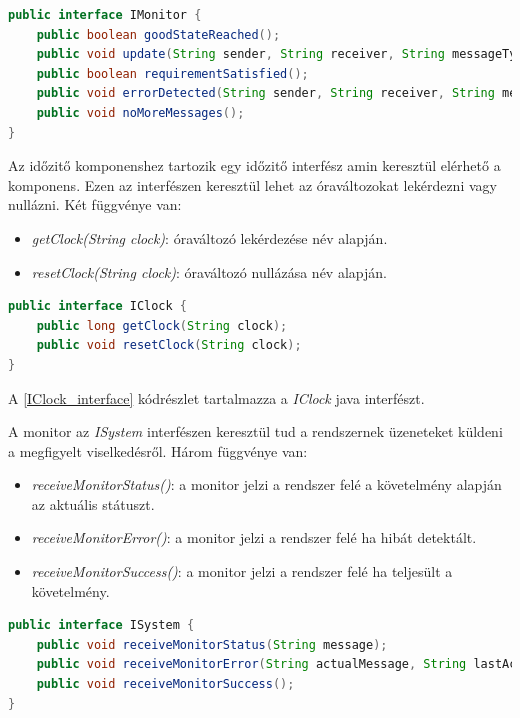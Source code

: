 \begin{lstlisting}[language=java,frame=single, float=h!, caption={Monitor interfész Java implementációja.},captionpos=b,label=IMonitor_interface]
public interface IMonitor {
	public boolean goodStateReached();
	public void update(String sender, String receiver, String messageType, Map<String, Object> parameters);
	public boolean requirementSatisfied();
	public void errorDetected(String sender, String receiver, String messageType, Map<String, Object> parameters);
	public void noMoreMessages();
}
\end{lstlisting}

Az időzitő komponenshez tartozik egy időzitő interfész amin keresztül elérhető a komponens.
Ezen az interfészen keresztül lehet az óraváltozokat lekérdezni vagy nullázni.
Két függvénye van:

\begin{itemize}
    \item \textit{getClock(String clock)}: óraváltozó lekérdezése név alapján.
    \item \textit{resetClock(String clock)}: óraváltozó nullázása név alapján.
\end{itemize}

\begin{lstlisting}[language=java,frame=single, float=h!, caption={Időzitő interfész Java implementációja.},captionpos=b,label=IClock_interface]
public interface IClock {
	public long getClock(String clock);
	public void resetClock(String clock);
}
\end{lstlisting}

A \ref{IClock_interface} kódrészlet tartalmazza a \textit{IClock} java interfészt.

A monitor az \textit{ISystem} interfészen keresztül tud a rendszernek üzeneteket küldeni a megfigyelt viselkedésről.
Három függvénye van:

\begin{itemize}
	\item \textit{receiveMonitorStatus()}: a monitor jelzi a rendszer felé a követelmény alapján az aktuális státuszt.
	\item \textit{receiveMonitorError()}: a monitor jelzi a rendszer felé ha hibát detektált.
	\item \textit{receiveMonitorSuccess()}: a monitor jelzi a rendszer felé ha teljesült a követelmény.
\end{itemize}

\begin{lstlisting}[language=java,frame=single, float=h!, caption={Rendszer interfész Java implementációja.},captionpos=b, label=ISystem_interface]
public interface ISystem {
	public void receiveMonitorStatus(String message);
	public void receiveMonitorError(String actualMessage, String lastAcceptedMessage);
	public void receiveMonitorSuccess();
}
\end{lstlisting}

